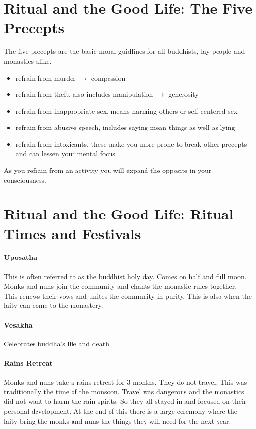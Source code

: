 \documentclass{article}
\begin{document}
\section*{Ritual and the Good Life: The Five Precepts}
\label{sec:ritual_and_the_good_life_the_five_precepts}
The five precepts are the basic moral guidlines for all buddhists, lay people and monastics alike.

\begin{itemize}
	\item refrain from murder $\rightarrow$ compassion
	\item refrain from theft, also includes manipulation $\rightarrow$ generosity
	\item refrain from inappropriate sex, means harming others or self centered sex
	\item refrain from abusive speech, includes saying mean things as well as lying
	\item refrain from intoxicants, these make you more prone to break other precepts and can lessen your mental focus
\end{itemize}

As you refrain from an activity you will expand the opposite in your consciousness.


\section*{Ritual and the Good Life: Ritual Times and Festivals}
\label{sec:ritual_and_the_good_life_ritual_times_and_festivals}
\paragraph{Uposatha}
\label{par:uposatha}
This is often referred to as the buddhist holy day. Comes on half and full moon. Monks and nuns join the community and chants the monastic rules together. This renews their vows and unites the community in purity. This is also when the laity can come to the monastery.

\paragraph{Vesakha}
\label{par:vesakha}
Celebrates buddha's life and death.

\paragraph{Rains Retreat}
\label{par:rain_retreat}
Monks and nuns take a rains retreat for 3 months. They do not travel. This was traditionally the time of the monsoon. Travel was dangerous and the monastics did not want to harm the rain spirits. So they all stayed in and focused on their personal development. At the end of this there is a large ceremony where the laity bring the monks and nuns the things they will need for the next year.
\end{document}
